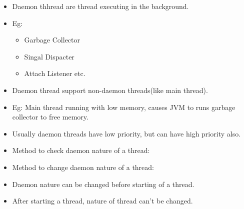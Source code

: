 \setlength{\columnsep}{3pt}
\begin{flushleft}
	\begin{itemize}
		\item Daemon thhread are thread executing in the background.
		\item Eg:
		\begin{itemize}
			\item Garbage Collector
			\item Singal Dispacter
			\item Attach Listener etc.
		\end{itemize}
		\item Daemon thread support non-daemon threads(like main thread).
		\item Eg: Main thread running with low memory, causes JVM to runs garbage collector to free memory.
		\item Usually daemon threads have low priority, but can have high priority also.
		\item Method to check daemon nature of a thread:
		\bigskip
		\item Method to change daemon nature of a thread:
		\bigskip
		\item Daemon nature can be changed before starting of a thread. 
		\item After starting a thread, nature of thread can't be changed.
	\end{itemize}
\end{flushleft}
\newpage
